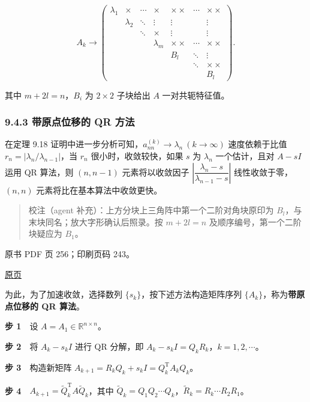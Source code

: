 \[
A_k\to\begin{pmatrix}
\lambda_1&\times&\cdots&\times&\times\times&\cdots&\times\times\\
&\lambda_2&\ddots&\vdots&\vdots&&\vdots\\
&&\ddots&\times&\vdots&&\vdots\\
&&&\lambda_m&\times\times&\cdots&\times\times\\
&&&&B_l&\ddots&\vdots\\
&&&&&\ddots&\times\times\\
&&&&&&B_l
\end{pmatrix}.
\]

其中 \(m+2l=n\)，\(B_i\) 为 \(2\times2\) 子块给出 \(A\) 一对共轭特征值。

\subsubsection{9.4.3 带原点位移的 QR 方法}\label{ch09b-ux5e26ux539fux70b9ux4f4dux79fbux7684-qr-ux65b9ux6cd5}

在定理 9.18 证明中进一步分析可知，\(a_{nn}^{(k)}\to\lambda_n\ (k\to\infty)\) 速度依赖于比值 \(r_n=|\lambda_n/\lambda_{n-1}|\)，当 \(r_n\) 很小时，收敛较快，如果 \(s\) 为 \(\lambda_n\) 一个估计，且对 \(A-sI\) 运用 QR 算法，则 \((n,n-1)\) 元素将以收敛因子 \(\left|\dfrac{\lambda_n-s}{\lambda_{n-1}-s}\right|\) 线性收敛于零，\((n,n)\) 元素将比在基本算法中收敛更快。

\begin{quote}
校注（agent 补充）：上方分块上三角阵中第一个二阶对角块原印为 \(B_l\)，与末块同名；放大字形确认后照录。按 \(m+2l=n\) 及顺序编号，第一个二阶块疑应为 \(B_1\)。
\end{quote}

\clearpage

原书 PDF 页 256；印刷页码 243。

\href{source-images/pdf-256.jpeg}{原页}

为此，为了加速收敛，选择数列 \(\{s_k\}\)，按下述方法构造矩阵序列 \(\{A_k\}\)，称为\textbf{带原点位移的 QR 算法}。

\textbf{步 1}　设 \(A=A_1\in\mathbb R^{n\times n}\)。

\textbf{步 2}　将 \(A_k-s_kI\) 进行 QR 分解，即 \(A_k-s_kI=Q_kR_k\)，\(k=1,2,\cdots\)。

\textbf{步 3}　构造新矩阵 \(A_{k+1}=R_kQ_k+s_kI=Q_k^{\mathrm T}A_kQ_k\)。

\textbf{步 4}　\(A_{k+1}=\widetilde Q_k^{\mathrm T}A\widetilde Q_k\)，其中 \(\widetilde Q_k=Q_1Q_2\cdots Q_k\)，\(\widetilde R_k=R_k\cdots R_2R_1\)。

